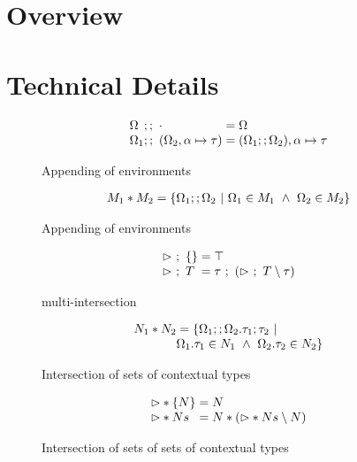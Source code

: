 \documentclass[sigplan,screen]{acmart}
\begin{document}
\section{Overview}

\section{Technical Details}

\begin{figure}[h]
  \[
    \begin{array}{l @{}l @{}l}
    \Omega &;;\ \cdot
    & {}= \Omega 
    \\
    \Omega_1 &;;\ (\Omega_2,\alpha \mapsto \tau) 
    & {}= (\Omega_1;;\Omega_2),\alpha \mapsto \tau
    \end{array}
  \]

  \caption{Appending of environments}
\end{figure}

\begin{figure}[h]
  \[
    \begin{array}{l @{}l}
    M_1 * M_2 
    & {}= 
    \{ \Omega_1 ;; \Omega_2 \ |\ 
      \Omega_1 \in M_1
      \ \wedge\ 
      \Omega_2 \in M_2
    \}
    \end{array}
  \]

  \caption{Appending of environments}
\end{figure}

\begin{figure}[h]
  \[
    \begin{array}{l @{}l}
    \rhd\ ;\ \{ \} 
    & {}= \top
    \\
    \rhd\ ;\ T
    & {}= \tau\ ;\ (\rhd\ ;\ T \setminus \tau)
    \end{array}
  \]

  \caption{multi-intersection}
\end{figure}

\begin{figure}[h]
  \[
    \begin{array}{l @{}l}
    N_1 * N_2
    & {}= 
    \{ \Omega_1 ;; \Omega_2 . \tau_1;\tau_2 \ |\ 
      \\
      & {} \Omega_1.\tau_1 \in N_1
      \ \wedge\ 
      \Omega_2.\tau_2 \in N_2
    \}
    \end{array}
  \]

  \caption{Intersection of sets of contextual types}
\end{figure}

\begin{figure}[h]
  \[
    \begin{array}{l @{}l}
    \rhd * \{ N \}
    & {}= N
    \\
    \rhd * Ns
    & {}= N * (\rhd * Ns \setminus N)
    \end{array}
  \]

  \caption{Intersection of sets of sets of contextual types}
\end{figure}
\end{document}
